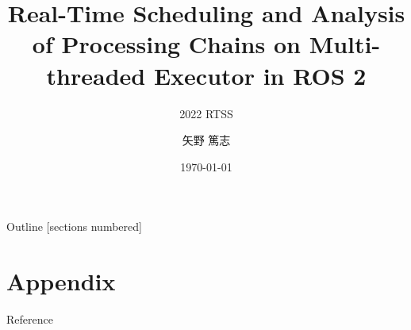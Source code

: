 \newcommand{\beamerDir}[0]{/mnt/c/Users/atsushi/Documents/workspace/env/Beamer/beamer/beamer/}





\title{Real-Time Scheduling and Analysis of Processing Chains on Multi-threaded Executor in ROS 2}
\subtitle{2022 RTSS}
\author{矢野 篤志}
\date{\today}




\maketitle

% 

\begin{frame}{Outline}
    [sections numbered]
    \tableofcontents[hideallsubsections]
\end{frame}

% 

% 
% 
% 
% 



\lastpage

\section*{Appendix}

\begin{frame}[allowframebreaks]{Reference}
    \beamertemplatetextbibitems
    
    
\end{frame}


